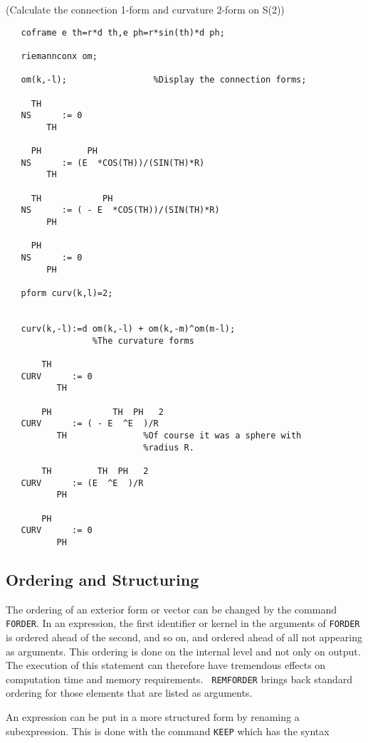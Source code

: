 \example (Calculate the connection 1-form and curvature 2-form on S(2))

\begin{verbatim}
   coframe e th=r*d th,e ph=r*sin(th)*d ph;

   riemannconx om;

   om(k,-l);                 %Display the connection forms;

     TH
   NS      := 0
        TH

     PH         PH
   NS      := (E  *COS(TH))/(SIN(TH)*R)
        TH

     TH            PH
   NS      := ( - E  *COS(TH))/(SIN(TH)*R)
        PH

     PH
   NS      := 0
        PH

   pform curv(k,l)=2;


   curv(k,-l):=d om(k,-l) + om(k,-m)^om(m-l);
                 %The curvature forms

       TH
   CURV      := 0
          TH

       PH            TH  PH   2
   CURV      := ( - E  ^E  )/R
          TH               %Of course it was a sphere with
                           %radius R.

       TH         TH  PH   2
   CURV      := (E  ^E  )/R
          PH

       PH
   CURV      := 0
          PH
\end{verbatim}

\subsection{Ordering and Structuring}

 
The ordering of an exterior form or vector can be changed by the
command {\tt FORDER}.\label{FORDER}  In an expression, the first
identifier or kernel in the arguments of {\tt FORDER} is ordered ahead
of the second, and so on, and ordered ahead of all not appearing as
arguments.  This ordering is done on the internal level and not only
on output.  The execution of this statement can therefore have
tremendous effects on computation time and memory requirements.  {\tt
REMFORDER}\label{REMFORDER} brings back standard ordering for those
elements that are listed as arguments. 

An expression can be put in a more structured form by renaming a
subexpression.  This is done with the command {\tt KEEP} which
has the syntax \label{KEEP}

